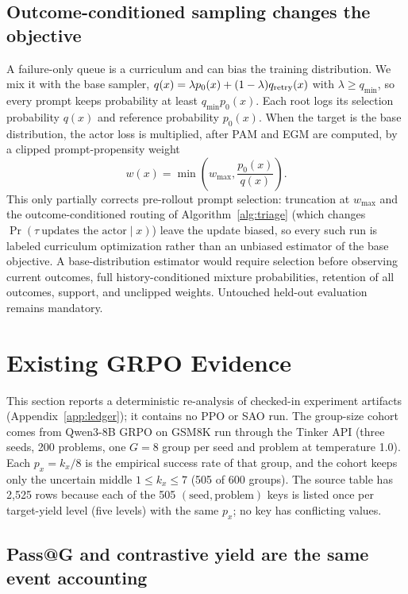 \documentclass{article}
\begin{document}
\subsection{Outcome-conditioned sampling changes the objective}

A failure-only queue is a curriculum and can bias the training distribution.
We mix it with the base sampler,
$q(x)=\lambda p_0(x)+(1-\lambda)q_{\rm retry}(x)$ with $\lambda\ge q_{\min}$, so
every prompt keeps probability at least $q_{\min}p_0(x)$.  Each root logs its
selection probability $q(x)$ and reference probability $p_0(x)$.  When the
target is the base distribution, the actor loss is multiplied, after PAM and
EGM are computed, by a clipped prompt-propensity weight
\begin{equation}
  w(x)=\min\!\left(w_{\max},\frac{p_0(x)}{q(x)}\right).
  \label{eq:propensity}
\end{equation}
This only partially corrects pre-rollout prompt selection: truncation at
$w_{\max}$ and the outcome-conditioned routing of Algorithm~\ref{alg:triage}
(which changes $\Pr(\tau\ \text{updates the actor}\mid x)$) leave the update
biased, so every such run is labeled curriculum optimization rather than an
unbiased estimator of the base objective.  A base-distribution estimator would
require selection before observing current outcomes, full history-conditioned
mixture probabilities, retention of all outcomes, support, and unclipped
weights.  Untouched held-out evaluation remains mandatory.

\section{Existing GRPO Evidence}
\label{sec:evidence}

This section reports a deterministic re-analysis of checked-in experiment
artifacts (Appendix~\ref{app:ledger}); it contains no PPO or SAO run.  The
group-size cohort comes from Qwen3-8B GRPO on GSM8K run through the Tinker API
(three seeds, 200 problems, one $G{=}8$ group per seed and problem at
temperature 1.0).  Each $p_x=k_x/8$ is the empirical success rate of that
group, and the cohort keeps only the uncertain middle $1\le k_x\le7$
(505 of 600 groups).  The source table has 2,525 rows because each of the 505
$(\text{seed},\text{problem})$ keys is listed once per target-yield level
(five levels) with the same $p_x$; no key has conflicting values.

\subsection{Pass@G and contrastive yield are the same event accounting}
\end{document}
